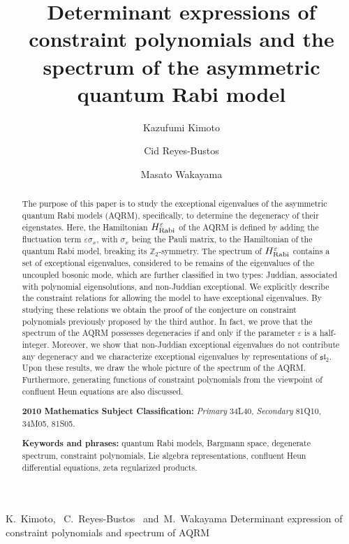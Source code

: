 \documentclass[11pt]{article}
\numberwithin{equation}{section}
\newcommand{\MSC}[2]{\smallskip\noindent %
\textbf{2010 Mathematics Subject Classification:}
\textit{Primary} #1, \textit{Secondary} #2.}
\newcommand{\keywords}[1]{\smallskip\noindent\textbf{Keywords and phrases:} #1.} %
\newcommand{\Z}{\mathbb{Z}} %
\newcommand{\e}{\varepsilon}
\newcommand{\HRabi}[1]{H_{\text{\upshape Rabi}}^{#1}} %
\theoremstyle{plain}
\theoremstyle{definition}
\theoremstyle{remark}
\begin{document}
\title{Determinant expressions of constraint polynomials and the spectrum of the asymmetric quantum Rabi model}

\pagestyle{myheadings}
\markboth
{K.~Kimoto, ~C.~Reyes-Bustos~ and~M.~Wakayama}
{Determinant expression of constraint polynomials and spectrum of AQRM}


\author{Kazufumi Kimoto \and Cid Reyes-Bustos \and Masato Wakayama}

\maketitle


\begin{abstract}
  The purpose of this paper is to study the exceptional eigenvalues of the asymmetric quantum Rabi models (AQRM),
  specifically, to determine the degeneracy of their eigenstates. Here, the Hamiltonian $\HRabi{\e}$ of the AQRM is defined by adding
  the fluctuation term $\e\sigma_x$, with $\sigma_x$ being the Pauli matrix, to the Hamiltonian of the quantum Rabi model, breaking its $\Z_{2}$-symmetry.
  The spectrum of $\HRabi{\e}$ contains a set of exceptional eigenvalues, considered to be remains of the eigenvalues of the uncoupled
  bosonic mode, which are further classified in two types: Juddian, associated with polynomial eigensolutions, and non-Juddian exceptional.
  We explicitly describe the constraint relations for allowing the model to have exceptional eigenvalues. By studying these relations
  we obtain the proof of the conjecture on constraint polynomials previously proposed by the third author.
  In fact, we prove that the spectrum of the AQRM possesses degeneracies if and only if the parameter $\e$ is a half-integer. Moreover,
  we show that non-Juddian exceptional eigenvalues do not contribute any degeneracy and we characterize
  exceptional eigenvalues by representations of $\mathfrak{sl}_2$. Upon these results, we draw the whole picture of the spectrum of the AQRM.
  Furthermore, generating functions of constraint polynomials from the viewpoint of confluent Heun equations are also discussed.

  \MSC{34L40}{81Q10, 34M05, 81S05}
  
  \keywords{quantum Rabi models, Bargmann space, degenerate spectrum, constraint polynomials,
    Lie algebra representations, confluent Heun differential equations, zeta regularized products}
\end{abstract}
\end{document}
